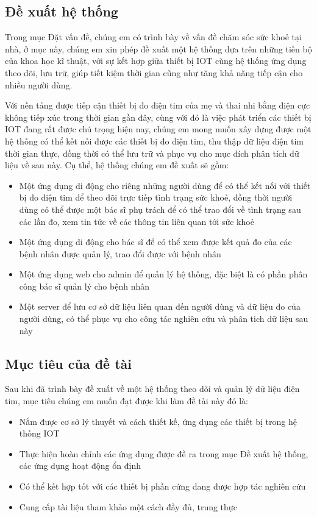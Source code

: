 \subsection*{Đề xuất hệ thống}

Trong mục Đặt vấn đề, chúng em có trình bày về vấn đề chăm sóc sức khoẻ tại nhà, ở mục này, chúng em xin phép đề xuất một hệ thống
dựa trên những tiến bộ của khoa học kĩ thuật, với sự kết hợp giữa thiết bị IOT cùng hệ thống ứng dụng theo dõi, lưu trữ,
giúp tiết kiệm thời gian cũng như tăng khả năng tiếp cận cho nhiều người dùng. 

Với nền tảng được tiếp cận thiết bị đo điện tim của mẹ và thai nhi bằng điện cực không tiếp xúc trong thời gian gần đây, 
cùng với đó là việc phát triển các thiết bị IOT đang rất được chú trọng hiện nay, chúng em mong muốn xây dựng được một hệ thống
có thể kết nối được các thiết bị đo điện tim, thu thập dữ liệu điện tim thời gian thực, đồng thời có thể lưu trữ và phục vụ cho mục đích
phân tích dữ liệu về sau này. Cụ thể, hệ thống chúng em đề xuất sẽ gồm:

\begin{itemize}
  \item Một ứng dụng di động cho riêng những người dùng để có thể kết nối với thiết bị đo điện tim để theo dõi trực tiếp tình trạng sức khoẻ, đồng
  thời người dùng có thể được một bác sĩ phụ trách để có thể trao đổi về tình trạng sau các lần đo, xem tin tức về các thông tin liên quan tới sức khoẻ
  \item Một ứng dụng di động cho bác sĩ để có thể xem được kết quả đo của các bệnh nhân được quản lý, trao đổi được với bệnh nhân
  \item Một ứng dụng web cho admin để quản lý hệ thống, đặc biệt là có phần phân công bác sĩ quản lý cho bệnh nhân
  \item Một server để lưu cơ sở dữ liệu liên quan đến người dùng và dữ liệu đo của người dùng, có thể phục vụ cho công tác nghiên cứu và
  phân tich dữ liệu sau này
\end{itemize}

\subsection*{Mục tiêu của đề tài}
Sau khi đã trình bày đề xuất về một hệ thống theo dõi và quản lý dữ liệu điện tim, mục tiêu chúng em muốn đạt được khi
làm đề tài này đó là:

\begin{itemize}
  \item Nắm được cơ sở lý thuyết và cách thiết kế, ứng dụng các thiết bị trong hệ thống IOT
  \item Thực hiện hoàn chỉnh các ứng dụng được đề ra trong mục Đề xuất hệ thống, các ứng dụng hoạt động ổn định
  \item Có thể kết hợp tốt với các thiết bị phần cứng đang được hợp tác nghiên cứu
  \item Cung cấp tài liệu tham khảo một cách đầy đủ, trung thực
\end{itemize}

